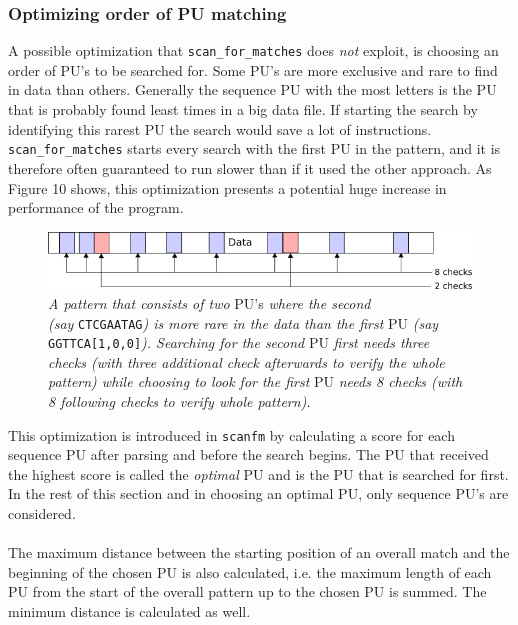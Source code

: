 \documentclass[12pt]{article}
\newcommand{\scm}{\texttt{scan\_for\_matches} }
\newcommand{\sfm}{\texttt{scanfm} }
\newcommand{\pu}{PU }
\newcommand{\pus}{PU's }
\begin{document}
\subsubsection{Optimizing order of \pu matching}
A possible optimization that \scm does \textit{not} exploit, is choosing an order of \pus to be searched for.
Some \pus are more exclusive and rare to find in data than others. Generally the sequence \pu with the most
letters is the \pu that is probably found least times in a big data file. If starting the search by
identifying this rarest \pu the search would save a lot of instructions. \scm starts every search with the 
first \pu in the pattern, and it is therefore often guaranteed to run slower than if it used the other approach.
As Figure 10 shows, this optimization presents a potential huge increase in performance of the program.
\begin{figure}[H]
\begin{center}
\includegraphics[scale=0.8]{Diagrams/opti.png}
\end{center}
\caption{\textit{A pattern that consists of two} \pus \textit{where the second \\(say}
\texttt{CTCGAATAG}\textit{) is more rare in the data than the first} \pu \textit{(say }\texttt{GGTTCA[1,0,0]}\textit{). 
Searching for the 
second} \pu \textit{first needs three checks (with three additional check afterwards to verify the whole pattern)
while choosing to look for the first} \pu \textit{needs 8 checks (with 8 following checks to verify whole pattern).}}
\end{figure}
\noindent This optimization is introduced in \sfm by calculating a score for each sequence \pu after parsing and before
the search begins. 
The \pu that received the highest score is called the \emph{optimal} \pu and is 
the \pu that is searched for first. In the rest of this section and in choosing an optimal PU, only sequence \pus
are considered. \\ \\
The maximum
distance between the starting position of an overall match and the beginning of the chosen \pu is also calculated, i.e.
the maximum length of each \pu from the start of the overall pattern up to the chosen \pu is summed. The minimum
distance is calculated as well. \\ \\
\end{document}
